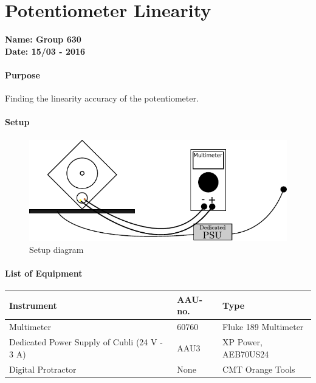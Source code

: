 \chapter{Potentiometer Linearity}\label{app:potentiometerLin} 
\textbf{Name: Group 630}\\
\textbf{Date: 15/03 - 2016}

\subsubsection{Purpose}
Finding the linearity accuracy of the potentiometer.

\subsubsection{Setup}
\begin{figure}[H]
	\centering
	\includegraphics[scale=1]{figures/LabSetupLinearityTest.pdf}
	\caption{Setup diagram}
	\label{LabSetupRangeTest}
\end{figure}\vspace{-5mm}

\subsubsection{List of Equipment}
\begin{table}[H]
	\begin{tabular}{|l|l|p{4.3cm}|}
		\hline%
		\textbf{Instrument}                                  &  \textbf{AAU-no.}  &  \textbf{Type}                       \\
		\hline%
		Multimeter                                           &  60760           &  Fluke 189 Multimeter		                   \\
		\hline%
		Dedicated Power Supply of Cubli \small{(24 V - 3 A)} &  AAU3                   &  XP Power, AEB70US24                 \\
		\hline%
		Digital Protractor                                   &  None               & CMT Orange Tools     \\
		\hline%
	\end{tabular}
\end{table}

